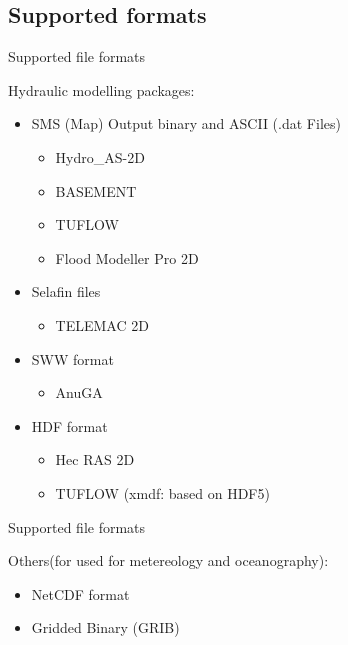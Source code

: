 \subsection{Supported formats}
\begin{frame}{Supported file formats}
	\begin{block}{Hydraulic modelling packages:}
		\begin{itemize}
			\item SMS (Map) Output binary and ASCII (.dat Files)
				\begin{itemize}
					\item Hydro\_AS-2D
					\item BASEMENT
					\item TUFLOW
					\item Flood Modeller Pro 2D
				\end{itemize}
			\item Selafin files
					\begin{itemize}
						\item TELEMAC 2D
					\end{itemize}
			\item SWW format
					\begin{itemize}
						\item AnuGA
					\end{itemize}
			\item HDF format
					\begin{itemize}
						\item Hec RAS 2D
						\item TUFLOW (xmdf: based on HDF5)
					\end{itemize}
		\end{itemize}
	
	\end{block}
	
\end{frame}

\begin{frame}{Supported file formats}
	\begin{block}{Others(for used for metereology and oceanography):}
		\begin{itemize}
			\item NetCDF format
			\item Gridded Binary (GRIB)
		\end{itemize}
		
	\end{block}


\end{frame}